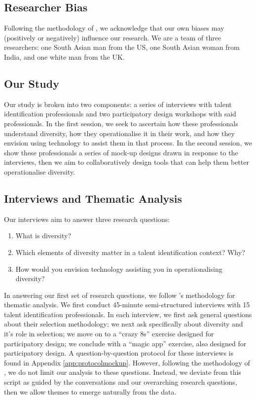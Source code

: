 \subsection{Researcher Bias}
Following the methodology of \textcite{braun_using_2006}, we acknowledge that our own biases may (positively or negatively) influence our research. We are a team of three researchers: one South Asian man from the US, one South Asian woman from India, and one white man from the UK.

\subsection{Our Study}
Our study is broken into two components: a series of interviews with talent identification professionals and two participatory design workshops with said professionals. In the first session, we seek to ascertain how these professionals understand diversity, how they operationalise it in their work, and how they envision using technology to assist them in that process. In the second session, we show these professionals a series of mock-up designs drawn in response to the interviews, then we aim to collaboratively design tools that can help them better operationalise diversity.

\subsection{Interviews and Thematic Analysis}
Our interviews aim to answer three research questions:

\begin{enumerate}
    \item What is diversity?
    \item Which elements of diversity matter in a talent identification context? Why?
    \item How would you envision technology assisting you in operationalising diversity?
\end{enumerate}

In answering our first set of research questions, we follow \cite{braun_using_2006}'s methodology for thematic analysis. We first conduct 45-minute semi-structured interviews with 15 talent identification professionals. In each interview, we first ask general questions about their selection methodology; we next ask specifically about diversity and it's role in selection; we move on to a ``crazy 8s'' exercise designed for participatory design; we conclude with a ``magic app'' exercise, also designed for participatory design. A question-by-question protocol for these interviews is found in Appendix \ref{app:protocolmockup}. However, following the methodology of \cite{braun_using_2006}, we do not limit our analysis to these questions. Instead, we deviate from this script as guided by the conversations and our overarching research questions, then we allow themes to emerge naturally from the data.

